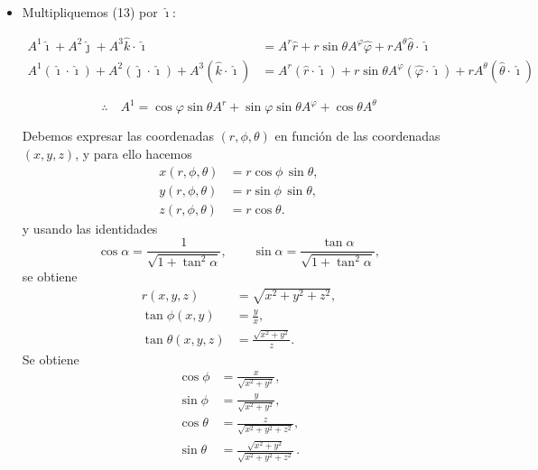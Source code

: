 \documentclass[../apunte_mecanica_clasica.tex]{subfiles}%
\begin{document}
\begin{itemize}
    \item Multipliquemos (13) por $\hat{\imath}$:

\begin{equation*}
\begin{aligned}
A^1 \hat{\imath} + A^2 \hat{\jmath} + A^3 \hat{k} \cdot \hat{\imath} 
&= A^r \hat{r} + r \sin\theta A^\varphi \hat{\varphi} + r A^\theta \hat{\theta} \cdot \hat{\imath} \\
A^1 (\hat{\imath} \cdot \hat{\imath}) + A^2 (\hat{\jmath} \cdot \hat{\imath}) + A^3 (\hat{k} \cdot \hat{\imath}) 
&= A^r (\hat{r} \cdot \hat{\imath}) + r \sin\theta A^\varphi (\hat{\varphi} \cdot \hat{\imath}) + r A^\theta (\hat{\theta} \cdot \hat{\imath})
\end{aligned}
\end{equation*}

\begin{equation*}
\therefore \quad A^1 = \cos\varphi \sin\theta A^r + \sin\varphi \sin\theta A^\varphi + \cos\theta A^\theta
\end{equation*}

Debemos expresar las coordenadas $(r,\phi,\theta)$ en función de las coordenadas $(x,y,z)$, y para ello hacemos
\begin{equation*}
\begin{aligned}
x(r,\phi,\theta) &= r\cos\phi\,\sin\theta,\\
y(r,\phi,\theta) &= r\sin\phi\,\sin\theta,\\
z(r,\phi,\theta) &= r\cos\theta.
\end{aligned}
\end{equation*}
y usando las identidades
\begin{equation*}
\cos\alpha = \frac{1}{\sqrt{1+\tan^2\alpha}}, 
\qquad 
\sin\alpha = \frac{\tan\alpha}{\sqrt{1+\tan^2\alpha}},
\end{equation*}
se obtiene
\begin{equation*}
\begin{aligned}
r(x,y,z) &= \sqrt{x^2+y^2+z^2},\\
\tan\phi(x,y) &= \frac{y}{x},\\
\tan\theta(x,y,z) &= \frac{\sqrt{x^2+y^2}}{z}.
\end{aligned}
\end{equation*}
Se obtiene
\begin{equation*}
\begin{aligned}
\cos\phi &= \frac{x}{\sqrt{x^2 + y^2}},\\[4pt]
\sin\phi &= \frac{y}{\sqrt{x^2 + y^2}},\\[4pt]
\cos\theta &= \frac{z}{\sqrt{x^2 + y^2 + z^2}},\\[4pt]
\sin\theta &= \frac{\sqrt{x^2 + y^2}}{\sqrt{x^2 + y^2 + z^2}}\,.
\end{aligned}
\end{equation*}


\end{itemize}
\end{document}
